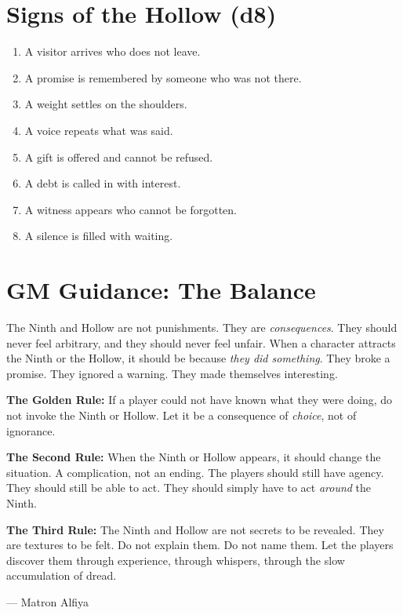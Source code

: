 \documentclass[11pt]{book}
\begin{document}
\section*{Signs of the Hollow (d8)}
\begin{enumerate}
  \item A visitor arrives who does not leave.
  \item A promise is remembered by someone who was not there.
  \item A weight settles on the shoulders.
  \item A voice repeats what was said.
  \item A gift is offered and cannot be refused.
  \item A debt is called in with interest.
  \item A witness appears who cannot be forgotten.
  \item A silence is filled with waiting.
\end{enumerate}

\section*{GM Guidance: The Balance}

The Ninth and Hollow are not punishments. They are \textit{consequences}. They should never feel arbitrary, and they should never feel unfair. When a character attracts the Ninth or the Hollow, it should be because \textit{they did something}. They broke a promise. They ignored a warning. They made themselves interesting.

\textbf{The Golden Rule:} If a player could not have known what they were doing, do not invoke the Ninth or Hollow. Let it be a consequence of \textit{choice}, not of ignorance.

\textbf{The Second Rule:} When the Ninth or Hollow appears, it should change the situation. A complication, not an ending. The players should still have agency. They should still be able to act. They should simply have to act \textit{around} the Ninth.

\textbf{The Third Rule:} The Ninth and Hollow are not secrets to be revealed. They are textures to be felt. Do not explain them. Do not name them. Let the players discover them through experience, through whispers, through the slow accumulation of dread.

\begin{flushright}
--- Matron Alfiya
\end{flushright}
\end{document}
